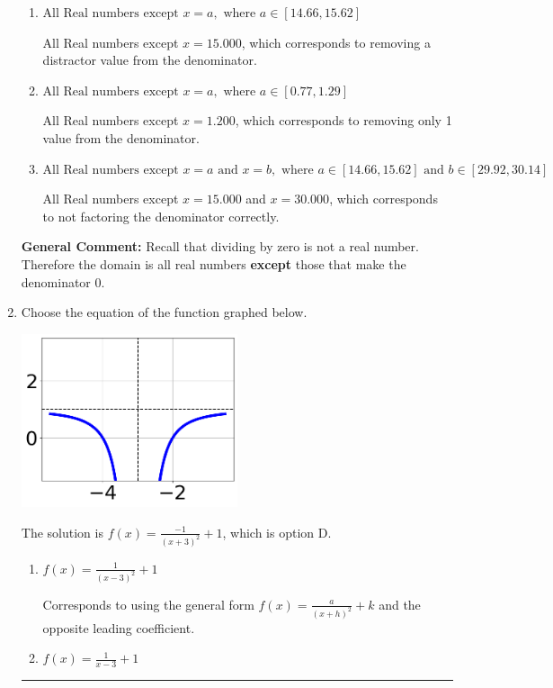\documentclass{extbook}[14pt]
\newcommand{\litem}[1]{\item #1

\rule{\textwidth}{0.4pt}}
\begin{document}
\begin{enumerate}
{\begin{enumerate}[label=\Alph*.]
All Real numbers except $x = 1.200$ and $x = 1.667$, which is the correct option.
\item \( \text{All Real numbers except } x = a, \text{ where } a \in [14.66, 15.62] \)

All Real numbers except $x = 15.000$, which corresponds to removing a distractor value from the denominator.
\item \( \text{All Real numbers except } x = a, \text{ where } a \in [0.77, 1.29] \)

All Real numbers except $x = 1.200$, which corresponds to removing only 1 value from the denominator.
\item \( \text{All Real numbers except } x = a \text{ and } x = b, \text{ where } a \in [14.66, 15.62] \text{ and } b \in [29.92, 30.14] \)

All Real numbers except $x = 15.000$ and $x = 30.000$, which corresponds to not factoring the denominator correctly.
\end{enumerate}

\textbf{General Comment:} Recall that dividing by zero is not a real number. Therefore the domain is all real numbers \textbf{except} those that make the denominator 0.
}
\litem{
Choose the equation of the function graphed below.

\begin{center}
    \includegraphics[width=0.5\textwidth]{../Figures/rationalGraphToEquationCopyB.png}
\end{center}



The solution is \( f(x) = \frac{-1}{(x + 3)^2} + 1 \), which is option D.\begin{enumerate}[label=\Alph*.]
\item \( f(x) = \frac{1}{(x - 3)^2} + 1 \)

Corresponds to using the general form $f(x) = \frac{a}{(x+h)^2}+k$ and the opposite leading coefficient.
\item \( f(x) = \frac{1}{x - 3} + 1 \)


\end{enumerate}}
\end{enumerate}
\end{document}
